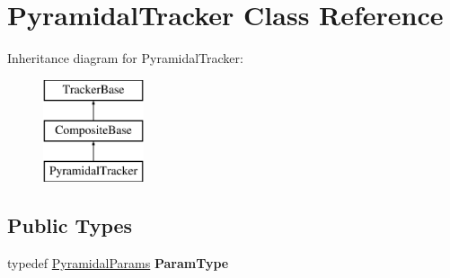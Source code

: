 \hypertarget{classPyramidalTracker}{\section{Pyramidal\-Tracker Class Reference}
\label{classPyramidalTracker}
}
Inheritance diagram for Pyramidal\-Tracker\-:\begin{figure}[H]
\begin{center}
\leavevmode
\includegraphics[height=3.000000cm]{classPyramidalTracker}
\end{center}
\end{figure}
\subsection*{Public Types}
\begin{DoxyCompactItemize}
\item 
\hypertarget{classPyramidalTracker_a813c7697543f75c1e94e8613f96785b3}{typedef \hyperlink{structPyramidalParams}{Pyramidal\-Params} {\bfseries Param\-Type}}\label{classPyramidalTracker_a813c7697543f75c1e94e8613f96785b3}

\end{DoxyCompactItemize}
